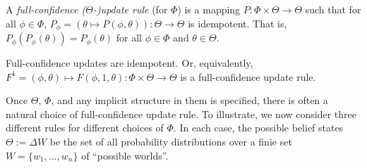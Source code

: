 \begin{defn}
	A \emph{full-confidence ($\Theta$-)update rule} (for $\Phi$) is
	a mapping $P: \Phi \times \Theta \to \Theta$ such that
	for all $\phi \in \Phi$, 
	$P_\phi = (\theta \mapsto P(\phi,\theta)): \Theta \to \Theta$ is idempotent.
	That is,	
	$P_\phi(P_\phi(\theta)) = P_\phi(\theta)$
	 for all $\phi\in\Phi$ and $\theta \in \Theta$.
\end{defn}


\begin{CFaxioms}
	\item
	Full-confidence updates are idempotent. Or,
	equivalently,
	$F^1 = (\phi, \theta) \mapsto F(\phi,1,\theta): \Phi \times \Theta \to \Theta$ is a full-confidence
	update rule.
	\label{ax:idemp}
\end{CFaxioms}


Once $\Theta$, $\Phi$, and any implicit structure in them is specified, there is often a natural choice of full-confidence update rule.
To illustrate, we now consider three different rules for different choices of $\Phi$.
In each case, the possible belief states $\Theta := \Delta W$ be the set of all probability distributions over a finie set $W = \{w_1, \ldots, w_n\}$ of ``possible worlds''.

